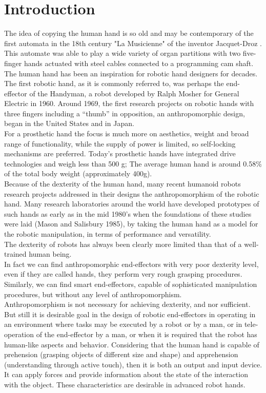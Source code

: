 \documentclass[a4paper, 10pt, conference]{ieeeconf}      %
\begin{document}
\section{\textbf{Introduction}}
The idea of copying the human hand is so old and may be contemporary of the first automata in the 18th century "La Musicienne" of the inventor Jacquet-Droz \cite{birglen2007underactuated}. This automate was able to play a wide variety of organ partitions with two five-finger hands actuated with steel cables connected to a programming cam shaft.\\
The human hand has been an inspiration for robotic hand designers for decades. The first robotic hand, as it is commonly referred to, was perhaps the end-effector of the Handyman, a robot developed by Ralph Mosher for General Electric in 1960. Around 1969, the first research projects on robotic hands with three fingers including a “thumb” in opposition, an anthropomorphic design, began in the United States and in Japan.\\
For a prosthetic hand the focus is much more on aesthetics, weight and broad range of functionality, while the supply of power is limited, so self-locking mechanisms are preferred. Today's prosthetic hands have integrated drive technologies and weigh less than 500 g; The average human hand is around 0.58\% of the total body weight (approximately 400g).\\
Because of the dexterity of the human hand, many recent humanoid robots research projects addressed in their designs the anthropomorphism of the robotic hand. Many research laboratories around the world have developed prototypes of such hands as early as in the mid 1980’s when the foundations of these studies were laid (Mason and Salisbury 1985), by taking the human hand as a model for the robotic manipulation, in terms of performance and versatility.\\
The dexterity of robots has always been clearly more limited than that of a well-trained human being.\\
In fact we can find anthropomorphic end-effectors with very poor dexterity level, even if they are called hands, they perform very rough grasping procedures. Similarly, we can find smart end-effectors, capable of sophisticated manipulation procedures, but without any level of anthropomorphism.\\
Anthropomorphism is not necessary for achieving dexterity, and nor sufficient. But still it is desirable goal in the design of robotic end-effectors in operating in an environment where tasks may be executed by a robot or by a man, or in tele-operation of the end-effector by a man, or when it is required that the robot has human-like aspects and behavior. Considering that the human hand is capable of prehension (grasping objects of different size and shape) and apprehension (understanding through active touch), then it is both an output and input device. It can apply forces and provide information about the state of the interaction with the object. These characteristics are desirable in advanced robot hands.\\
\end{document}
